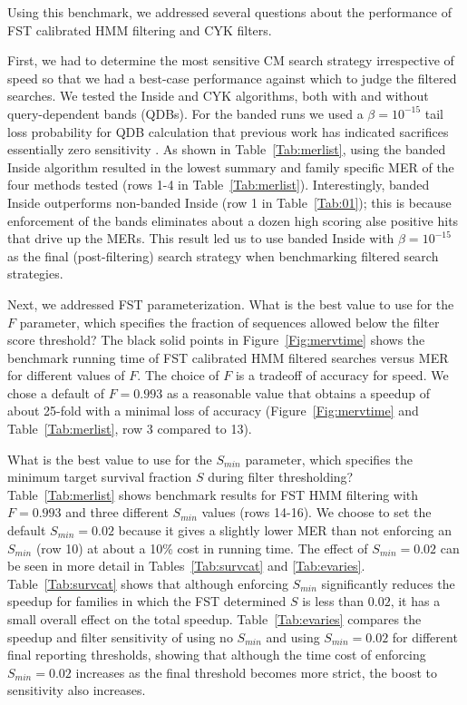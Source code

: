 Using this benchmark, we addressed several questions about the
performance of FST calibrated HMM filtering and CYK filters. 

First, we had to determine the most sensitive CM search strategy
irrespective of speed so that we had a best-case performance against
which to judge the filtered searches. We tested the Inside and CYK
algorithms, both with and without query-dependent bands (QDBs). For
the banded runs we used a $\beta=10^{-15}$ tail loss probability for
QDB calculation that previous work has indicated sacrifices
essentially zero sensitivity \citep{NawrockiEddy07}.  As shown in
Table~\ref{Tab:merlist}, using the banded Inside algorithm resulted in
the lowest summary and family specific MER of the four methods tested
(rows 1-4 in Table~\ref{Tab:merlist}). Interestingly, banded Inside
outperforms non-banded Inside (row 1 in Table~\ref{Tab:01}); this is
because enforcement of the bands eliminates about a dozen high scoring
alse positive hits that drive up the MERs.  This result led us to use
banded Inside with $\beta=10^{-15}$ as the final (post-filtering) search
strategy when benchmarking filtered search strategies.

Next, we addressed FST parameterization.  What is the best value to
use for the $F$ parameter, which specifies the fraction of sequences
allowed below the filter score threshold? The black solid points in
Figure~\ref{Fig:mervtime} shows the benchmark running time of FST
calibrated HMM filtered searches versus MER for different values of
$F$. The choice of $F$ is a tradeoff of accuracy for speed.
We chose a default of $F=0.993$ as a reasonable value that obtains a
speedup of about 25-fold with a minimal loss of accuracy
(Figure~\ref{Fig:mervtime} and Table~\ref{Tab:merlist}, row 3 compared
to 13).

What is the best value to use for the $S_{min}$ parameter, which
specifies the minimum target survival fraction $S$ during filter
thresholding? Table~\ref{Tab:merlist} shows benchmark results for FST
HMM filtering with $F=0.993$ and three different $S_{min}$ values
(rows 14-16). We choose to set the default $S_{min}=0.02$ because it
gives a slightly lower MER than not enforcing an $S_{min}$ (row 10) at
about a 10\% cost in running time. The effect of $S_{min}=0.02$ can be
seen in more detail in Tables~\ref{Tab:survcat} and \ref{Tab:evaries}.
Table~\ref{Tab:survcat} shows that although enforcing $S_{min}$
significantly reduces the speedup for families in which the FST
determined $S$ is less than $0.02$, it has a small overall effect on
the total speedup.  Table~\ref{Tab:evaries} compares the speedup and
filter sensitivity of using no $S_{min}$ and using $S_{min}=0.02$ for
different final reporting thresholds, showing that although the time
cost of enforcing $S_{min}=0.02$ increases as the final threshold
becomes more strict, the boost to sensitivity also increases. 

